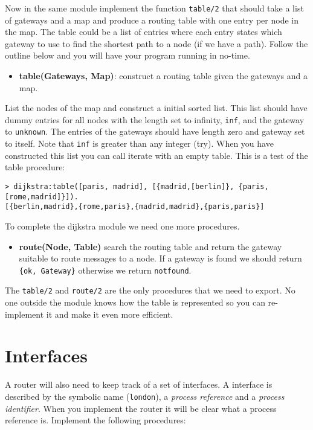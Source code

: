 \documentclass[a4paper, 11pt]{article}
\begin{document}
Now in the same module implement the function {\tt table/2} that
should take a list of gateways and a map and produce a routing table
with one entry per node in the map. The table could be a list of
entries where each entry states which gateway to use to find the
shortest path to a node (if we have a path). Follow the outline below
and you will have your program running in no-time.

\begin{itemize}
\item {\bf table(Gateways, Map)}: construct a routing table given the
gateways and a map. 
\end{itemize}

List the nodes of the map and construct a initial sorted list. This
list should have dummy entries for all nodes with the length set to
infinity, {\tt inf}, and the gateway to {\tt unknown}. The entries of
the gateways should have length zero and gateway set to itself. Note
that {\tt inf} is greater than any integer (try). When you have
constructed this list you can call iterate with an empty table. This
is a test of the table procedure:

\begin{verbatim}
> dijkstra:table([paris, madrid], [{madrid,[berlin]}, {paris, [rome,madrid]}]).
[{berlin,madrid},{rome,paris},{madrid,madrid},{paris,paris}]
\end{verbatim}

To complete the dijkstra module we need one more procedures. 

\begin{itemize}
\item {\bf route(Node, Table)} search the routing table and return the
gateway suitable to route messages to a node. If a gateway is found we
should return {\tt \{ok, Gateway\}} otherwise we return {\tt notfound}.
\end{itemize}

The {\tt table/2} and {\tt route/2} are the only procedures that we
need to export. No one outside the module knows how the table is
represented so you can re-implement it and make it even more efficient.

\section{Interfaces}

A router will also need to keep track of a set of interfaces. A
interface is described by the symbolic name ({\tt london}), a {\em process
reference} and a {\em process identifier}. When you implement the router it
will be clear what a process reference is. Implement the following procedures:
\end{document}
